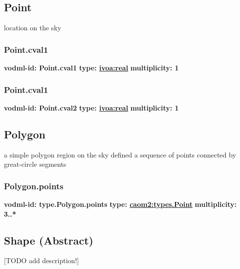   \subsection{Point}
  \label{sect:types.Point}
    location on the sky

    \subsubsection{Point.cval1}
      \textbf{vodml-id: Point.cval1} \newline
      \textbf{type: \hyperref[sect:ivoa]{ivoa:real}} \newline
      \textbf{multiplicity: 1} 

    \subsubsection{Point.cval1}
      \textbf{vodml-id: Point.cval2} \newline
      \textbf{type: \hyperref[sect:ivoa]{ivoa:real}} \newline
      \textbf{multiplicity: 1} 

  \subsection{Polygon}
  \label{sect:types.Polygon}
    a simple polygon region on the sky defined a sequence of points connected by great-circle segments

    \subsubsection{Polygon.points}
      \textbf{vodml-id: type.Polygon.points} \newline
      \textbf{type: \hyperref[sect:types.Point]{caom2:types.Point}} \newline
      \textbf{multiplicity: 3..*} 

  \subsection{Shape (Abstract)}
  \label{sect:types.Shape}
    [TODO add description!]